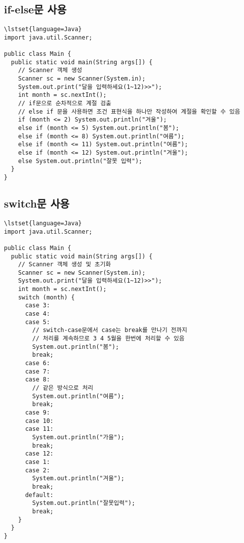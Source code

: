 \documentclass{article}
\begin{document}
\subsection{if-else문 사용}
\begin{lstlisting}
\lstset{language=Java}
import java.util.Scanner;

public class Main {
  public static void main(String args[]) {
    // Scanner 객체 생성
    Scanner sc = new Scanner(System.in);
    System.out.print("달을 입력하세요(1~12)>>");
    int month = sc.nextInt();
    // if문으로 순차적으로 계절 검출
    // else if 문을 사용하면 조건 표현식을 하나만 작성하여 계절을 확인할 수 있음
    if (month <= 2) System.out.println("겨울");
    else if (month <= 5) System.out.println("봄");
    else if (month <= 8) System.out.println("여름");
    else if (month <= 11) System.out.println("여름");
    else if (month <= 12) System.out.println("겨울");
    else System.out.println("잘못 입력");
  }
}
\end{lstlisting}
\subsection{switch문 사용}
\begin{lstlisting}
\lstset{language=Java}
import java.util.Scanner;

public class Main {
  public static void main(String args[]) {
    // Scanner 객체 생성 및 초기화
    Scanner sc = new Scanner(System.in);
    System.out.print("달을 입력하세요(1~12)>>");
    int month = sc.nextInt();
    switch (month) {
      case 3:
      case 4:
      case 5:
        // switch-case문에서 case는 break를 만나기 전까지
        // 처리를 계속하므로 3 4 5월을 한번에 처리할 수 있음
        System.out.println("봄");
        break;
      case 6:
      case 7:
      case 8:
        // 같은 방식으로 처리
        System.out.println("여름");
        break;
      case 9:
      case 10:
      case 11:
        System.out.println("가을");
        break;
      case 12:
      case 1:
      case 2:
        System.out.println("겨울");
        break;
      default:
        System.out.println("잘못입력");
        break;
    }
  }
}
\end{lstlisting}
\end{document}
